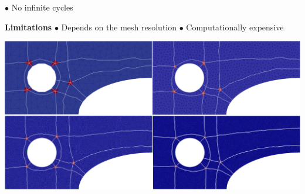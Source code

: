 \documentclass[a0paper,portrait, fontscale=0.30]{baposter}
\begin{document}
\begin{poster}
{\begin{tcolorbox}[colframe=gray,boxrule=0.01pt,left=0mm,right=0mm,title=\Large Discrete Strategy]
\begin{minipage}[t]{0.5\linewidth}
$\bullet$ No infinite cycles
\end{minipage}
\begin{minipage}[t]{0.49\linewidth}	%
\textbf{Limitations}
\newline
$\bullet$ Depends on the mesh resolution
\newline
$\bullet$ Computationally expensive
\vspace{-0.2cm}
\end{minipage}
\vspace{-0.2cm}
\end{tcolorbox}
\noindent
\vspace{-0.1cm}
\begin{center}
\begin{minipage}[b]{1.0\linewidth}%
\vspace{-0.35cm}                                 
\includegraphics[width=1.0\textwidth]{HIS_collection}%
\end{minipage}
\end{center}
\begin{center}
\begin{minipage}[b]{0.79\linewidth}%

\end{minipage}
\end{center}}
\end{poster}
\end{document}
